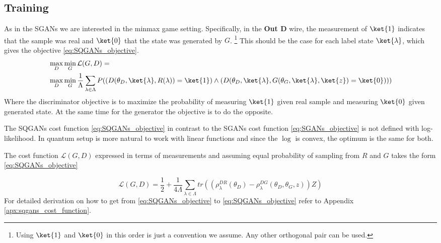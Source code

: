 \subsection{Training}
As in the SGANs we are interested in the minmax game setting. Specifically, in
the \textbf{Out D} wire, the measurement of $\ket{1}$ indicates that the sample
was real and $\ket{0}$ that the state was generated by $G$.
\footnote{Using $\ket{1}$ and $\ket{0}$ in this order is just a convention we
  assume. Any other orthogonal pair can be used.}
This should be the case for each label state $\ket{\lambda}$, which gives the
objective \ref{eq:SQGANs_objective}. 
\begin{equation}
  \begin{split}
  \label{eq:SQGANs_objective}
  & \max_{D}\min_{G} \mathcal{L}(G, D) = \\
  & \max_{D}\min_{G}  \frac{1}{\Lambda}\sum_{\lambda \in \Lambda}{P((D(\theta_D, \ket{\lambda}, R(\lambda)) = \ket{1}) \land (D(\theta_D, \ket{\lambda}, G(\theta_G, \ket{\lambda}, \ket{z}) = \ket{0})))}
  \end{split}
\end{equation} 
Where the discriminator objective is to maximize the probability of measuring $\ket{1}$
given real sample and measuring $\ket{0}$ given generated state. At the same
time for the generator the objective is to do the opposite.

The SQGANs cost function \ref{eq:SQGANs_objective} in contrast to the SGANs cost
function \ref{eq:SGANs_objective} is not defined with log-likelihood. In quantum
setup is more natural to work with linear functions and since the $\log$ is
convex, the optimum is the same for both.

The cost function $\mathcal{L}(G, D)$ expressed in terms of measurements and
assuming equal probability of sampling from $R$ and $G$ takes the form \ref{eq:SQGANs_objective}

\begin{equation}
  \label{eq:SQGAN_objective_trace}
  \mathcal{L}(G, D) = \frac{1}{2} + \frac{1}{4\Lambda}\sum_{\lambda \in
  \Lambda}{}tr((\rho_\lambda^{DR}(\theta_D) - \rho_\lambda^{DG}(\theta_D, \theta_G, z))Z)
\end{equation}
For detailed derivation on how to get from \ref{eq:SQGANs_objective} to
\ref{eq:SQGANs_objective} refer to Appendix \ref{apx:sqgans_cost_function}.

